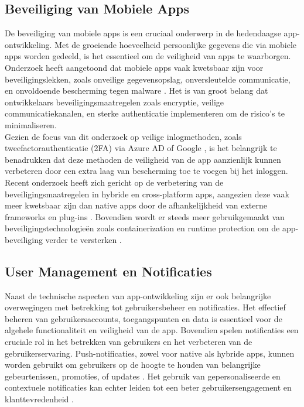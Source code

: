 \subsection{Beveiliging van Mobiele Apps} 
\noindent De beveiliging van mobiele apps is een cruciaal onderwerp in de hedendaagse app-ontwikkeling. Met de groeiende hoeveelheid persoonlijke gegevens die via mobiele apps worden gedeeld, is het essentieel om de veiligheid van apps te waarborgen. Onderzoek heeft aangetoond dat mobiele apps vaak kwetsbaar zijn voor beveiligingslekken, zoals onveilige gegevensopslag, onversleutelde communicatie, en onvoldoende bescherming tegen malware \autocite{Zhu2014}. Het is van groot belang dat ontwikkelaars beveiligingsmaatregelen zoals encryptie, veilige communicatiekanalen, en sterke authenticatie implementeren om de risico’s te minimaliseren.\\

\noindent Gezien de focus van dit onderzoek op veilige inlogmethoden, zoals tweefactorauthenticatie (2FA) via Azure AD of Google \autocite{Aussems2021}, is het belangrijk te benadrukken dat deze methoden de veiligheid van de app aanzienlijk kunnen verbeteren door een extra laag van bescherming toe te voegen bij het inloggen. Recent onderzoek heeft zich gericht op de verbetering van de beveiligingsmaatregelen in hybride en cross-platform apps, aangezien deze vaak meer kwetsbaar zijn dan native apps door de afhankelijkheid van externe frameworks en plug-ins \autocite{Wang2015}. Bovendien wordt er steeds meer gebruikgemaakt van beveiligingstechnologieën zoals containerization en runtime protection om de app-beveiliging verder te versterken \autocite{Weichbroth2020}.

\subsection{User Management en Notificaties} 
\noindent Naast de technische aspecten van app-ontwikkeling zijn er ook belangrijke overwegingen met betrekking tot gebruikersbeheer en notificaties. Het effectief beheren van gebruikersaccounts, toegangspunten en data is essentieel voor de algehele functionaliteit en veiligheid van de app. Bovendien spelen notificaties een cruciale rol in het betrekken van gebruikers en het verbeteren van de gebruikerservaring. Push-notificaties, zowel voor native als hybride apps, kunnen worden gebruikt om gebruikers op de hoogte te houden van belangrijke gebeurtenissen, promoties, of updates \autocite{Android2024}. Het gebruik van gepersonaliseerde en contextuele notificaties kan echter leiden tot een beter gebruikersengagement en klanttevredenheid \autocite{Sarin}.\\

